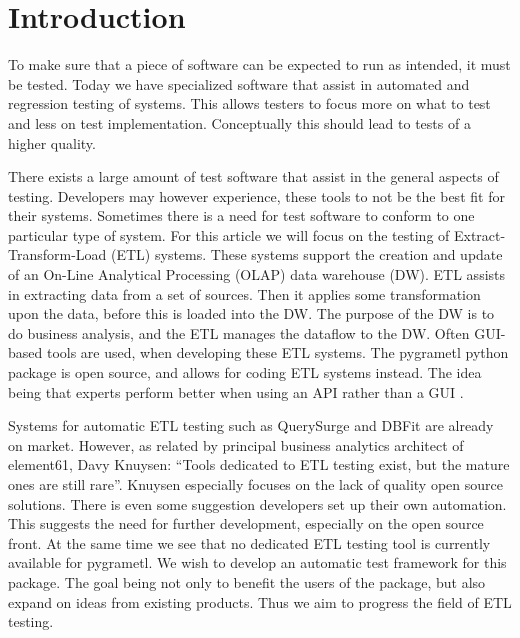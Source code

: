 \section*{Introduction} %

To make sure that a piece of software can be expected to run as intended, it must be tested. Today we have specialized software that assist in automated and regression testing of systems. This allows testers to focus more on what to test and less on test implementation. Conceptually this should lead to tests of a higher quality.

There exists a large amount of test software that assist in the general aspects of testing. Developers may however experience, these tools to not be the best fit for their systems. Sometimes there is a need for test software to conform to one particular type of system. For this article we will focus on the testing of Extract-Transform-Load (ETL) systems. These systems support the creation and update of an On-Line Analytical Processing (OLAP) data warehouse (DW). ETL assists in extracting data from a set of sources. Then it applies some transformation upon the data, before this is loaded into the DW. The purpose of the DW is to do business analysis, and the ETL manages the dataflow to the DW. Often GUI-based tools are used, when developing these ETL systems. The pygrametl python package is open source, and allows for coding ETL systems instead. The idea being that experts perform better when using an API rather than a GUI \cite{thomsen2009pygrametl}. 

Systems for automatic ETL testing such as QuerySurge and DBFit are already on market. However, as related by principal business analytics architect of element61, Davy Knuysen: “Tools dedicated to ETL testing exist, but the mature ones are still rare”\cite{element61}. Knuysen especially focuses on the lack of quality open source solutions. There is even some suggestion developers set up their own automation. This suggests the need for further development, especially on the open source front. At the same time we see that no dedicated ETL testing tool is currently available for pygrametl.  We wish to  develop an automatic test framework for this package. The goal being not only to benefit the users of the package, but also expand on ideas from existing products. Thus we aim to progress  the field of ETL testing.  

